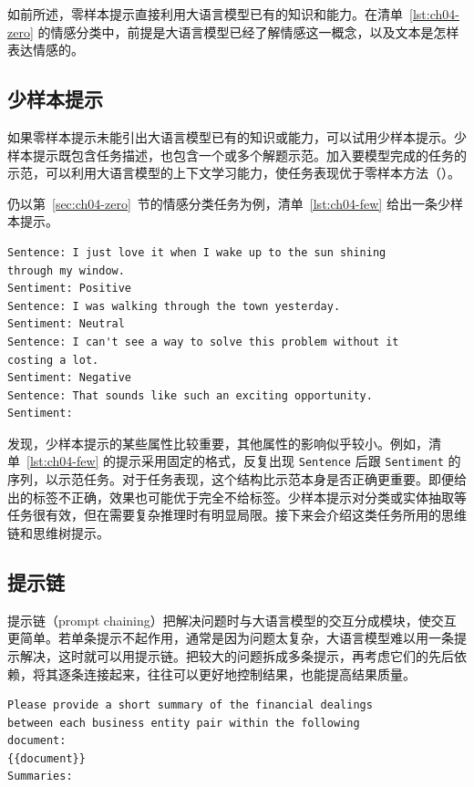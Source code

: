 如前所述，零样本提示直接利用大语言模型已有的知识和能力。在清单~\ref{lst:ch04-zero} 的情感分类中，前提是大语言模型已经了解情感这一概念，以及文本是怎样表达情感的。

\subsection{少样本提示}
\label{sec:ch04-few}
如果零样本提示未能引出大语言模型已有的知识或能力，可以试用少样本提示。少样本提示既包含任务描述，也包含一个或多个解题示范。加入要模型完成的任务的示范，可以利用大语言模型的上下文学习能力，使任务表现优于零样本方法（）。

仍以第~\ref{sec:ch04-zero}~节的情感分类任务为例，清单~\ref{lst:ch04-few} 给出一条少样本提示。

\noindent\begin{minipage}{\linewidth}
\begin{lstlisting}[caption={少样本情感分类提示},label={lst:ch04-few}]
Sentence: I just love it when I wake up to the sun shining
through my window.
Sentiment: Positive
Sentence: I was walking through the town yesterday.
Sentiment: Neutral
Sentence: I can't see a way to solve this problem without it
costing a lot.
Sentiment: Negative
Sentence: That sounds like such an exciting opportunity.
Sentiment:
\end{lstlisting}
\end{minipage}\par

发现，少样本提示的某些属性比较重要，其他属性的影响似乎较小。例如，清单~\ref{lst:ch04-few} 的提示采用固定的格式，反复出现 \texttt{Sentence} 后跟 \texttt{Sentiment} 的序列，以示范任务。对于任务表现，这个结构比示范本身是否正确更重要。即便给出的标签不正确，效果也可能优于完全不给标签。少样本提示对分类或实体抽取等任务很有效，但在需要复杂推理时有明显局限。接下来会介绍这类任务所用的思维链和思维树提示。

\subsection{提示链}
提示链（prompt chaining）把解决问题时与大语言模型的交互分成模块，使交互更简单。若单条提示不起作用，通常是因为问题太复杂，大语言模型难以用一条提示解决，这时就可以用提示链。把较大的问题拆成多条提示，再考虑它们的先后依赖，将其逐条连接起来，往往可以更好地控制结果，也能提高结果质量。

\noindent\begin{minipage}{\linewidth}
\begin{lstlisting}[caption={零样本情感分类提示},label={lst:ch04-finance-one}]
Please provide a short summary of the financial dealings
between each business entity pair within the following
document:
{{document}}
Summaries:
\end{lstlisting}
\end{minipage}\par

